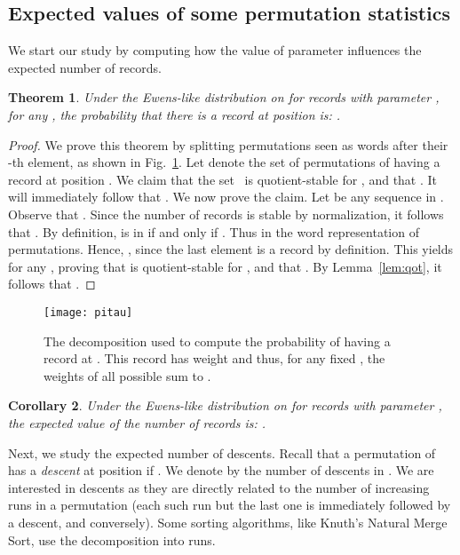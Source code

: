 \documentclass[proceedings]{aofa}
\newtheorem{theorem}{Theorem}
\newtheorem{corollary}[theorem]{Corollary}
\begin{document}
\subsection{Expected values of some permutation statistics}

We start our study by computing how the value of parameter  influences the expected number of records.

\begin{theorem}\label{lem:records}
Under the Ewens-like distribution on  for records with parameter , 
for any , 
the probability that there is a record at position  is: 
.
\end{theorem}

\begin{proof}
We prove this theorem by splitting permutations seen as words after their -th element, as shown in Fig.~\ref{fig:record}.
Let  denote the set of permutations of  having a record at position . 
We claim that the set~ is quotient-stable for , and that . 
It will immediately follow that .
We now prove the claim. 
Let  be any sequence in . 
Observe that . 
Since the number of records is stable by normalization, it follows that . 
By definition,  is in  if and only if . Thus  in the word representation of permutations. 
Hence, , since the last element is a record by definition. 
This yields  for any , 
proving that  is quotient-stable for , 
and that . 
 By Lemma~\ref{lem:qot}, it follows that 
.
\end{proof}

\begin{figure}[ht]
\begin{minipage}[]{.45\textwidth}
\texttt{[image: pitau]}
\end{minipage}
\begin{minipage}[]{.54\textwidth}
\caption{The decomposition used to compute the probability of having a record at . 
This record has weight  and thus, for any fixed , the weights of all possible  sum to .\label{fig:record}}
\end{minipage}
\end{figure}


\begin{corollary} \label{thm:nb_of_records}
Under the Ewens-like distribution on  for records with parameter , the expected value of the number of records is: 
.
\end{corollary}

\medskip

Next, we study the expected number of descents. 
Recall that a permutation  of  has a \emph{descent} at position  if
. We denote by  the number of descents in . 
We are interested in descents as they are directly related to the number of increasing runs in a permutation 
(each such run but the last one is immediately followed by a descent, and conversely). 
Some sorting algorithms, like Knuth's Natural Merge Sort, use the decomposition into runs.
\end{document}
